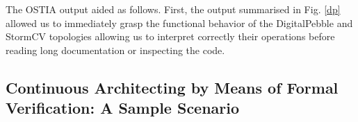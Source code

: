 \begin{figure}
\centering 
{}\label{dp}
\hspace{0.5cm}
\label{scv}
\end{figure}

The OSTIA output aided as follows. First, the output summarised in Fig. \ref{dp}
allowed us to immediately grasp the functional behavior of the DigitalPebble and
StormCV topologies allowing us to interpret correctly their operations before
reading long documentation or inspecting the code.
%

\subsection{Continuous Architecting by Means of Formal Verification: A Sample Scenario}